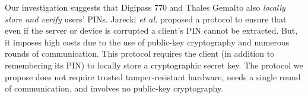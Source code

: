 Our investigation suggests that Digipass 770 and Thales Gemalto also \emph{locally store and verify} users' PINs. Jarecki \textit{et al.} \cite{JareckiJKSS21} proposed a protocol to ensure that even if the server or device is corrupted a client's PIN cannot be extracted. But, it imposes high costs due to the use of public-key cryptography and numerous rounds of communication. This protocol requires the client (in addition to remembering its PIN) to locally store a cryptographic secret key. The protocol we propose does not require trusted tamper-resistant hardware, needs a single round of communication, and involves no public-key cryptography.


